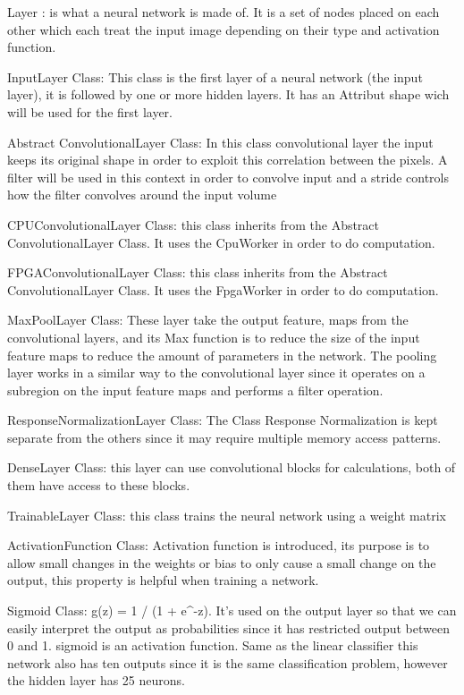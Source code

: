 \documentclass[parskip=full]{scrartcl}
\begin{document}
Layer : is what a neural network is made of. It is a set of nodes placed on each other which each treat the input image depending on their type and activation function.




InputLayer Class: This class is the first layer of a neural network (the input layer), it is followed by one or more hidden layers.  It has an Attribut shape wich will be used for the first layer.

Abstract ConvolutionalLayer Class: In this class convolutional layer the input keeps its original shape in order to exploit this correlation between the pixels. A filter will be used in this context in order to convolve input and a stride controls how the filter convolves around the input volume

CPUConvolutionalLayer Class: this class inherits from the Abstract ConvolutionalLayer Class. It uses the CpuWorker in order to do computation.

FPGAConvolutionalLayer Class: this class inherits from the Abstract ConvolutionalLayer Class. It uses the FpgaWorker in order to do computation.

MaxPoolLayer Class: These layer take the output feature, maps from the convolutional layers, and its Max function is to reduce the size of the input feature maps to reduce the amount of parameters in the network.
The pooling layer works in a similar way to the convolutional layer since it operates on a subregion on the input feature maps and performs a filter operation.

ResponseNormalizationLayer Class: The Class Response Normalization is kept separate from the others since it may require multiple memory access patterns.

DenseLayer Class:  this layer can use convolutional blocks for calculations, both of them have access to these blocks.

TrainableLayer Class: this class trains the neural network using a weight matrix

ActivationFunction Class:  Activation function is introduced, its purpose is to allow small changes in the weights or bias to only cause a small change on the output, this property is helpful when training a network.

Sigmoid Class:  g(z) = 1 / (1 + e^{-z}). It’s used on the output layer so that we can easily interpret the output as probabilities since it has restricted output between 0 and 1.
sigmoid is an activation function.  Same as the linear classifier this network also has ten outputs since it is the same classification problem, however the hidden layer has 25 neurons.
\end{document}
